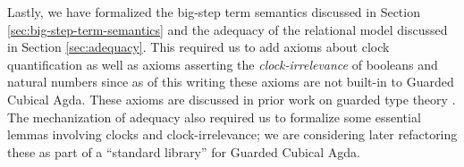 Lastly, we have formalized the big-step term semantics discussed in Section
\ref{sec:big-step-term-semantics} and the adequacy of the relational model
discussed in Section \ref{sec:adequacy}. This required us to add axioms about
clock quantification as well as axioms asserting the \emph{clock-irrelevance} of
booleans and natural numbers since as of this writing these axioms are not
built-in to Guarded Cubical Agda. These axioms are discussed in prior work on
guarded type theory \cite{atkey-mcbride2013, kristensen-mogelberg-vezzosi2022}.
The mechanization of adequacy also required us to formalize some essential
lemmas involving clocks and clock-irrelevance; we are considering later
refactoring these as part of a ``standard library'' for Guarded Cubical
Agda.

